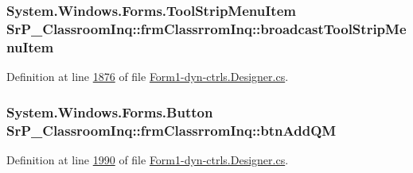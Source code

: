 \hypertarget{class_sr_p___classroom_inq_1_1frm_classrrom_inq_ac34894d134f025ca6e53b41c744bcf8e}{
\subsubsection[{broadcast\-Tool\-Strip\-Menu\-Item}]{\setlength{\rightskip}{0pt plus 5cm}\-System.\-Windows.\-Forms.\-Tool\-Strip\-Menu\-Item {\bf \-Sr\-P\-\_\-\-Classroom\-Inq\-::frm\-Classrrom\-Inq\-::broadcast\-Tool\-Strip\-Menu\-Item}}}
\label{class_sr_p___classroom_inq_1_1frm_classrrom_inq_ac34894d134f025ca6e53b41c744bcf8e}


\-Definition at line \hyperlink{_form1-dyn-ctrls_8_designer_8cs_source_l01876}{1876} of file \hyperlink{_form1-dyn-ctrls_8_designer_8cs_source}{\-Form1-\/dyn-\/ctrls.\-Designer.\-cs}.

\hypertarget{class_sr_p___classroom_inq_1_1frm_classrrom_inq_adda77c1d58e5db64040dff4228e6d97e}{
\subsubsection[{btn\-Add\-Q\-M}]{\setlength{\rightskip}{0pt plus 5cm}\-System.\-Windows.\-Forms.\-Button {\bf \-Sr\-P\-\_\-\-Classroom\-Inq\-::frm\-Classrrom\-Inq\-::btn\-Add\-Q\-M}}}
\label{class_sr_p___classroom_inq_1_1frm_classrrom_inq_adda77c1d58e5db64040dff4228e6d97e}


\-Definition at line \hyperlink{_form1-dyn-ctrls_8_designer_8cs_source_l01990}{1990} of file \hyperlink{_form1-dyn-ctrls_8_designer_8cs_source}{\-Form1-\/dyn-\/ctrls.\-Designer.\-cs}.


